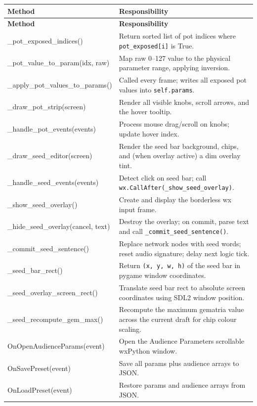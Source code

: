 \documentclass[11pt,a4paper]{report}
\begin{document}
\begin{longtable}{>{\ttfamily}p{} p{}}
\toprule
\textbf{Method} & \textbf{Responsibility} \\
\midrule
\endfirsthead
\toprule
\textbf{Method} & \textbf{Responsibility} \\
\midrule
\endhead
\_pot\_exposed\_indices() & Return sorted list of pot indices where
  \texttt{pot\_exposed[i]} is True. \\
\_pot\_value\_to\_param(idx, raw) & Map raw 0--127 value to the physical
  parameter range, applying inversion. \\
\_apply\_pot\_values\_to\_params() & Called every frame; writes all exposed
  pot values into \texttt{self.params}. \\
\_draw\_pot\_strip(screen) & Render all visible knobs, scroll arrows, and
  the hover tooltip. \\
\_handle\_pot\_events(events) & Process mouse drag/scroll on knobs; update
  hover index. \\
\_draw\_seed\_editor(screen) & Render the seed bar background, chips, and
  (when overlay active) a dim overlay tint. \\
\_handle\_seed\_events(events) & Detect click on seed bar; call
  \texttt{wx.CallAfter(\_show\_seed\_overlay)}. \\
\_show\_seed\_overlay() & Create and display the borderless wx input frame. \\
\_hide\_seed\_overlay(cancel, text) & Destroy the overlay; on commit, parse
  text and call \texttt{\_commit\_seed\_sentence()}. \\
\_commit\_seed\_sentence() & Replace network nodes with seed words; reset
  audio signature; delay next logic tick. \\
\_seed\_bar\_rect() & Return \texttt{(x, y, w, h)} of the seed bar in pygame
  window coordinates. \\
\_seed\_overlay\_screen\_rect() & Translate seed bar rect to absolute screen
  coordinates using SDL2 window position. \\
\_seed\_recompute\_gem\_max() & Recompute the maximum gematria value across
  the current draft for chip colour scaling. \\
OnOpenAudienceParams(event) & Open the Audience Parameters scrollable
  wxPython window. \\
OnSavePreset(event) & Save all params plus audience arrays to JSON. \\
OnLoadPreset(event) & Restore params and audience arrays from JSON. \\
\bottomrule
\end{longtable}
\end{document}
